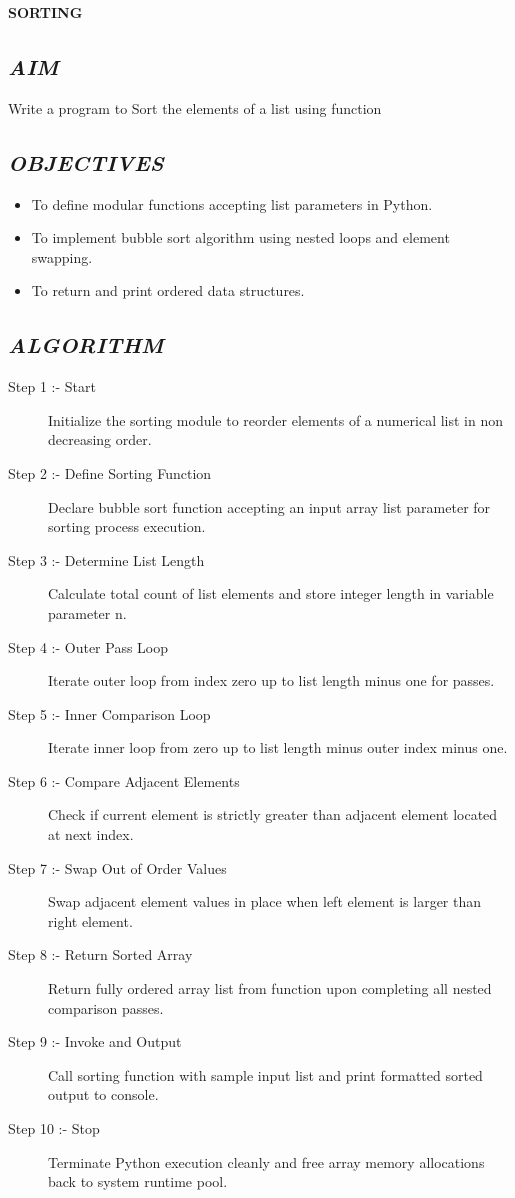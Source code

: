 \documentclass[11pt,a4paper]{article}
\begin{document}
\vspace{0.2cm}
\begin{center}
{\Huge \textbf{\textcolor{navyblue}{SORTING}}}
\end{center}
\vspace{0.3cm}

\subsection*{\textit{AIM}}
Write a program to Sort the elements of a list using function

\subsection*{\textit{OBJECTIVES}}
\begin{itemize}
  \item To define modular functions accepting list parameters in Python.
  \item To implement bubble sort algorithm using nested loops and element swapping.
  \item To return and print ordered data structures.
\end{itemize}

\subsection*{\textit{ALGORITHM}}
\begin{description}
  \item[Step 1 :- Start] Initialize the sorting module to reorder elements of a numerical list in non decreasing order.
  \item[Step 2 :- Define Sorting Function] Declare bubble sort function accepting an input array list parameter for sorting process execution.
  \item[Step 3 :- Determine List Length] Calculate total count of list elements and store integer length in variable parameter n.
  \item[Step 4 :- Outer Pass Loop] Iterate outer loop from index zero up to list length minus one for passes.
  \item[Step 5 :- Inner Comparison Loop] Iterate inner loop from zero up to list length minus outer index minus one.
  \item[Step 6 :- Compare Adjacent Elements] Check if current element is strictly greater than adjacent element located at next index.
  \item[Step 7 :- Swap Out of Order Values] Swap adjacent element values in place when left element is larger than right element.
  \item[Step 8 :- Return Sorted Array] Return fully ordered array list from function upon completing all nested comparison passes.
  \item[Step 9 :- Invoke and Output] Call sorting function with sample input list and print formatted sorted output to console.
  \item[Step 10 :- Stop] Terminate Python execution cleanly and free array memory allocations back to system runtime pool.
\end{description}
\end{document}
